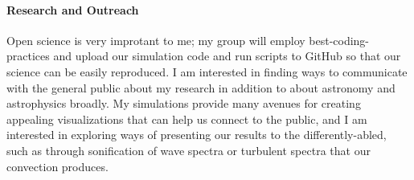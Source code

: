 \documentclass[12pt]{article}
\begin{document}
\paragraph*{Research and Outreach}
Open science is very improtant to me; my group will employ best-coding-practices and upload our simulation code and run scripts to GitHub so that our science can be easily reproduced.
I am interested in finding ways to communicate with the general public about my research in addition to about astronomy and astrophysics broadly.
My simulations provide many avenues for creating appealing visualizations that can help us connect to the public, and I am interested in exploring ways of presenting our results to the differently-abled, such as through sonification of wave spectra or turbulent spectra that our convection produces.

{\scriptsize

}
\end{document}
